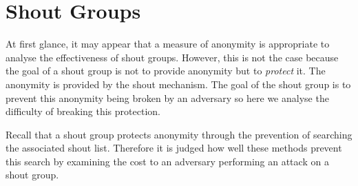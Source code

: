 \documentclass[ %
                    author={Luke Murray},
                supervisor={Dr. Simon Hollis},
                     title={Shadow Peer-to-Peer Networks},
                  subtitle={},
                    degree={MEng},
                      year={2013} ]{thesis}
\begin{document}
\section{Shout Groups}

At first glance, it may appear that a measure of anonymity is appropriate to analyse the effectiveness of shout groups. However, this is not the case because the goal of a shout group is not to provide anonymity but to {\em protect} it. The anonymity is provided by the shout mechanism. The goal of the shout group is to prevent this anonymity being broken by an adversary so here we analyse the difficulty of breaking this protection.

Recall that a shout group protects anonymity through the prevention of searching the associated shout list. Therefore it is judged how well these methods prevent this search by examining the cost to an adversary performing an attack on a shout group.
\end{document}
